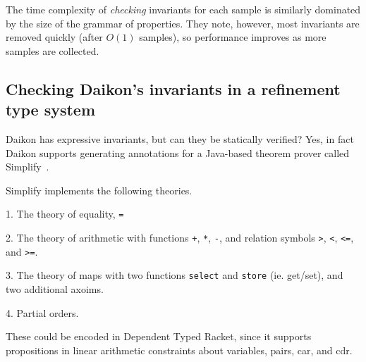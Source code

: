 The time complexity of \emph{checking} invariants for each sample
is similarly dominated by the size of the grammar of properties.
They note, however, most invariants are removed quickly (after
$O(1)$ samples), so performance improves as more samples
are collected.

\subsection{Checking Daikon's invariants in a refinement type system}

Daikon has expressive invariants, but can they be statically verified?
Yes, in fact Daikon supports generating annotations for a Java-based
theorem prover called Simplify~\cite{Detlefs03simplifya}.

Simplify implements the following theories.

1. The theory of equality, \texttt{=}

2. The theory of arithmetic with functions \texttt{+}, \texttt{*}, \texttt{-},
   and relation symbols \texttt{>}, \texttt{<}, \texttt{<=}, and \texttt{>=}.

3. The theory of maps with two functions \texttt{select} and \texttt{store} (ie. get/set),
   and two additional axoims.

4. Partial orders. %

These could be encoded in Dependent Typed Racket, since it supports propositions
in linear arithmetic constraints about variables, pairs, car, and cdr.


